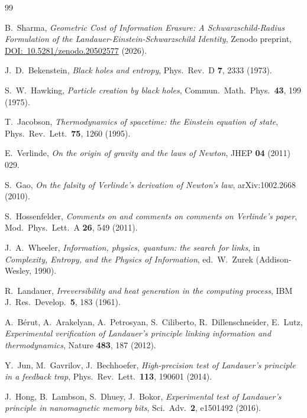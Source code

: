 \documentclass[aps,prd,twocolumn,showpacs,preprintnumbers,amsmath,amssymb,longbibliography]{revtex4-2}
\begin{document}
\begin{thebibliography}{99}

B.~Sharma,
\textit{Geometric Cost of Information Erasure: A Schwarzschild-Radius Formulation 
of the Landauer-Einstein-Schwarzschild Identity},
Zenodo preprint, \href{https://doi.org/10.5281/zenodo.20502577}{DOI:~10.5281/zenodo.20502577} (2026).

J.~D.~Bekenstein,
\textit{Black holes and entropy},
Phys.\ Rev.\ D \textbf{7}, 2333 (1973).

S.~W.~Hawking,
\textit{Particle creation by black holes},
Commun.\ Math.\ Phys.\ \textbf{43}, 199 (1975).

T.~Jacobson,
\textit{Thermodynamics of spacetime: the Einstein equation of state},
Phys.\ Rev.\ Lett.\ \textbf{75}, 1260 (1995).

E.~Verlinde,
\textit{On the origin of gravity and the laws of Newton},
JHEP \textbf{04} (2011) 029.

S.~Gao,
\textit{On the falsity of Verlinde's derivation of Newton's law},
arXiv:1002.2668 (2010).

S.~Hossenfelder,
\textit{Comments on and comments on comments on Verlinde's paper},
Mod.\ Phys.\ Lett.\ A \textbf{26}, 549 (2011).

J.~A.~Wheeler,
\textit{Information, physics, quantum: the search for links},
in \textit{Complexity, Entropy, and the Physics of Information},
ed.\ W.~Zurek (Addison-Wesley, 1990).

R.~Landauer,
\textit{Irreversibility and heat generation in the computing process},
IBM J.\ Res.\ Develop.\ \textbf{5}, 183 (1961).

A.~B\'erut, A.~Arakelyan, A.~Petrosyan, S.~Ciliberto, R.~Dillenschneider, E.~Lutz,
\textit{Experimental verification of Landauer's principle linking information 
and thermodynamics},
Nature \textbf{483}, 187 (2012).

Y.~Jun, M.~Gavrilov, J.~Bechhoefer,
\textit{High-precision test of Landauer's principle in a feedback trap},
Phys.\ Rev.\ Lett.\ \textbf{113}, 190601 (2014).

J.~Hong, B.~Lambson, S.~Dhuey, J.~Bokor,
\textit{Experimental test of Landauer's principle in nanomagnetic memory bits},
Sci.\ Adv.\ \textbf{2}, e1501492 (2016).


\end{thebibliography}
\end{document}
